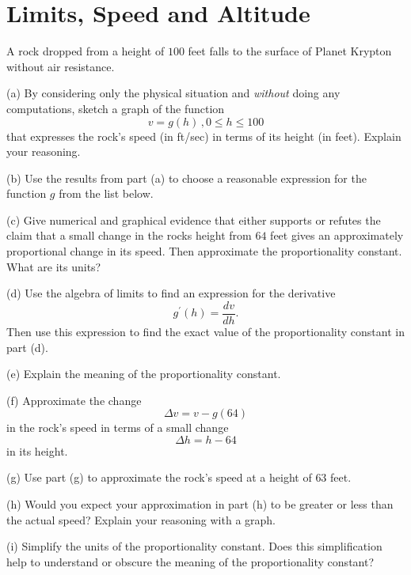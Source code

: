 \documentclass{ximera}
\begin{document}
\section{Limits, Speed and Altitude}
\begin{question}  \label{Ex:defdftd}
A rock dropped from a height of $100$ feet falls to the surface of Planet Krypton without air resistance.

(a) By considering only the physical situation and \emph{without} doing any computations, sketch a graph of the function
\[
    v =g(h) \, , 0\leq h \leq 100
\]
that expresses the rock's speed (in ft/sec) in terms of its height (in feet). Explain your reasoning.

(b) Use the results from part (a) to choose a reasonable expression for the function $g$ from the list below.

\begin{multipleChoice}
\end{multipleChoice}


(c)  Give numerical  and graphical evidence that either supports or refutes the claim that a small change in the rocks height from $64$ feet gives an approximately proportional change in its speed. Then approximate the proportionality constant. What are its units?
  
(d) Use the algebra of limits to find an expression for the derivative
\[
     g^\prime(h) = \frac{dv}{dh} .
\]
Then use this expression to find the exact value of the proportionality constant in part (d).

(e) Explain the meaning of the proportionality constant.

(f) Approximate the change
\[
    \Delta v = v - g(64)
\]
in the rock's speed in terms of a small change
\[
  \Delta h = h - 64
\]
in its height.

(g) Use part (g) to approximate the rock's speed at a height of $63$ feet.

(h) Would you expect your approximation in part (h) to be greater or less than the actual speed? Explain your reasoning with a graph.

(i) Simplify the units of the proportionality constant. Does this simplification help to understand or obscure the meaning of the proportionality constant?
\end{question}
\end{document}
